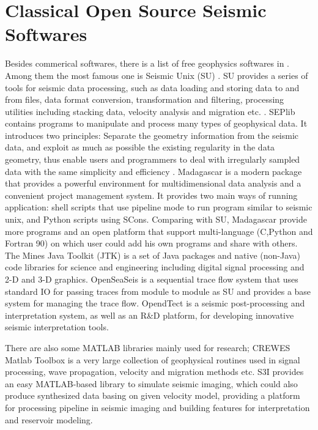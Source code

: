 \section{Classical Open Source Seismic Softwares}
Besides commerical softwares, there is a list of free geophysics softwares in \cite{listofgeosw}. Among them the most famous one is Seismic Unix (SU) \cite{SUHome}. SU provides a series of tools for seismic data processing, such as data loading and storing data to and from files, data format conversion, transformation and filtering, processing utilities including stacking data, velocity analysis and migration etc. \cite{SUManual}. SEPlib \cite{SEPlibHome} contains programs to manipulate and process many types of geophysical data. It introduces two principles: Separate the geometry information from the seismic data, and exploit as much as possible the existing regularity in the data geometry, thus enable users and programmers to deal with irregularly sampled data with the same simplicity and efficiency \cite{SEPManual}. Madagascar \cite{MadagascarHome} is a modern package that provides a powerful environment for multidimensional data analysis and a convenient project management system. It provides two main ways of running application: shell scripts that use pipeline mode to run program similar to seismic unix, and Python scripts using SCons. Comparing with SU, Madagascar provide more programs and an open platform that support multi-language (C,Python and Fortran 90) on which user could add his own programs and share with others. The Mines Java Toolkit (JTK) \cite{JTKHome} is a set of Java packages and native (non-Java) code libraries for science and engineering including digital signal processing and 2-D and 3-D graphics. OpenSeaSeis \cite{OpenSeaSeis} is a sequential trace flow system that uses standard I\/O for passing traces from module to module as SU and provides a base system for managing the trace flow. OpendTect \cite{OpendTectMainPage} is a seismic post-processing and interpretation system, as well as an R\&D platform, for developing innovative seismic interpretation tools.

There are also some MATLAB libraries mainly used for research; CREWES Matlab Toolbox \cite{CREWESMatlab} is a very large collection of geophysical routines used in signal processing, wave propagation, velocity and migration methods etc. S3I \cite{CeGPS3I} provides an easy MATLAB-based library to simulate seismic imaging, which could also produce synthesized data basing on given velocity model, providing a platform for processing pipeline in seismic imaging and building features for interpretation and reservoir modeling.  

